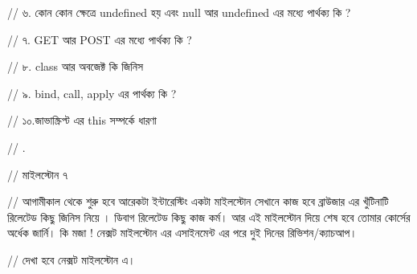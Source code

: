 // ৬. কোন কোন ক্ষেত্রে undefined হয় এবং null আর undefined এর মধ্যে পার্থক্য কি ? 

// ৭. GET আর POST এর মধ্যে পার্থক্য কি ?

// ৮. class আর অবজেক্ট কি জিনিস 

// ৯. bind, call, apply এর পার্থক্য কি ?

// ১০.জাভাস্ক্রিপ্ট এর this সম্পর্কে ধারণা

// .

// মাইলস্টোন ৭

// আগামীকাল থেকে শুরু হবে আরেকটা ইন্টারেস্টিং একটা মাইলস্টোন সেখানে কাজ হবে ব্রাউজার এর খুঁটিনাটি রিলেটেড কিছু জিনিস নিয়ে । ডিবাগ রিলেটেড কিছু কাজ কর্ম। আর এই মাইলস্টোন দিয়ে শেষ হবে তোমার কোর্সের অর্ধেক জার্নি। কি মজা ! নেক্সট মাইলস্টোন এর এসাইনমেন্ট এর পরে দুই দিনের রিভিশন/ক্যাচআপ।





// দেখা হবে নেক্সট মাইলস্টোন এ। 



